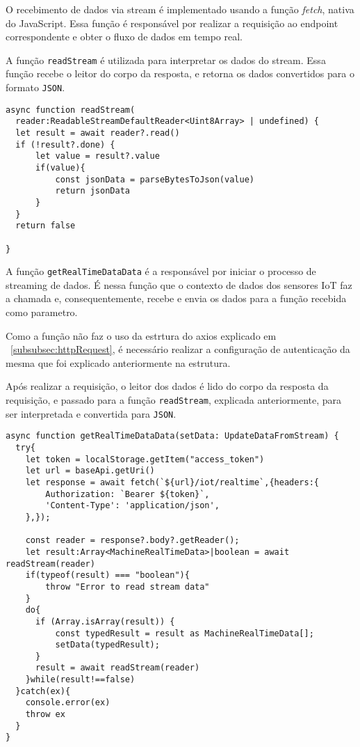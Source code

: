 O recebimento de dados via stream é implementado usando a função \textit{fetch}, nativa do JavaScript. Essa função é responsável por realizar a requisição ao endpoint correspondente e obter o fluxo de dados em tempo real.

A função \texttt{readStream} é utilizada para interpretar os dados do stream. Essa função recebe o leitor do corpo da resposta, e retorna os dados convertidos para o formato \texttt{JSON}.

\begin{verbatim}
async function readStream(
  reader:ReadableStreamDefaultReader<Uint8Array> | undefined) {
  let result = await reader?.read()
  if (!result?.done) {
      let value = result?.value
      if(value){
          const jsonData = parseBytesToJson(value)        
          return jsonData
      }
  }
  return false

}
\end{verbatim}

A função \texttt{getRealTimeDataData} é a responsável por iniciar o processo de streaming de dados. É nessa função que o contexto de dados dos sensores IoT faz a chamada e, consequentemente, recebe e envia os dados para a função recebida como parametro.

Como a função não faz o uso da estrtura do axios explicado em ~\ref{subsubsec:httpRequest}, é necessário realizar a configuração de autenticação da mesma que foi explicado anteriormente na estrutura.

Após realizar a requisição, o leitor dos dados é lido do corpo da resposta da requisição, e passado para a função \texttt{readStream}, explicada anteriormente, para ser interpretada e convertida para \texttt{JSON}.

\begin{verbatim}
async function getRealTimeDataData(setData: UpdateDataFromStream) {
  try{
    let token = localStorage.getItem("access_token")
    let url = baseApi.getUri()
    let response = await fetch(`${url}/iot/realtime`,{headers:{
        Authorization: `Bearer ${token}`,
        'Content-Type': 'application/json',
    },});

    const reader = response?.body?.getReader();
    let result:Array<MachineRealTimeData>|boolean = await readStream(reader)
    if(typeof(result) === "boolean"){
        throw "Error to read stream data"
    }
    do{
      if (Array.isArray(result)) {
          const typedResult = result as MachineRealTimeData[];
          setData(typedResult);
      }
      result = await readStream(reader)
    }while(result!==false)
  }catch(ex){
    console.error(ex)
    throw ex
  }
}
\end{verbatim}

